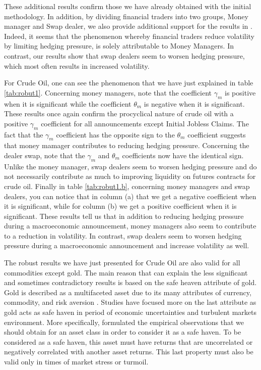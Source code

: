 \documentclass[12pt]{article}
\begin{document}
These additional results confirm those we have already obtained with the initial methodology. In addition, by dividing financial traders into two groups, Money manager and Swap dealer, we also provide additional support for the results in \citet{brunetti2016speculators}. Indeed, it seems that the phenomenon whereby financial traders reduce volatility by limiting hedging pressure, is solely attributable to Money Managers. In contrast, our results show that swap dealers seem to worsen hedging pressure, which most often results in increased volatility.

 
For Crude Oil, one can see the phenomenon that we have just explained in table \ref{tab:robut1}. Concerning money managers, note that the coefficient $\gamma_m$ is positive when it is significant while the coefficient $\theta_m$ is negative when it is significant. These results once again confirm the procyclical nature of crude oil with a positive $\gamma_m$ coefficient for all announcements except Initial Jobless Claims. The fact that the $\gamma_m$ coefficient has the opposite sign to the $\theta_m$ coefficient suggests that money mamager contributes to reducing hedging pressure. Concerning the dealer swap,  note that the $\gamma_m$ and $\theta_m$ coefficients now have the identical sign.  Unlike the money manager, swap dealers seem to worsen hedging pressure and do not necessarily contribute as much to improving liquidity on futures contracts for crude oil.  Finally in table \ref{tab:robut1.b}, concerning money managers and swap dealers, you can notice that in column (a) that we get a negative coefficient when it is significant, while for column (b) we get a positive coefficient when it is significant. These results tell us that in addition to reducing hedging pressure during a macroeconomic announcement, money managers also seem to contribute to a reduction in volatility.  In contrast, swap dealers seem to worsen hedging pressure during a macroeconomic announcement and increase volatility as well. 

The robust results we have just presented for Crude Oil are also valid for all commodities except gold. The main reason that can explain the less significant and sometimes contradictory results is based on the safe heaven attribute of gold.  Gold is described as a multifaceted asset due to its many attributes of currency,  commodity, and risk aversion \citep{wu2019does}. Studies have focused more on the last attribute as gold acts as safe haven in period of economic uncertainties and turbulent markets environment.  More specifically, \citet{baur2010gold} formulated the empirical observations that we should obtain for an asset class in order to consider it as a safe haven. To be considered as a safe haven, this asset must have returns that are uncorrelated or negatively correlated with another asset returns. This last property must also be valid only in times of market stress or turmoil. 
\end{document}
